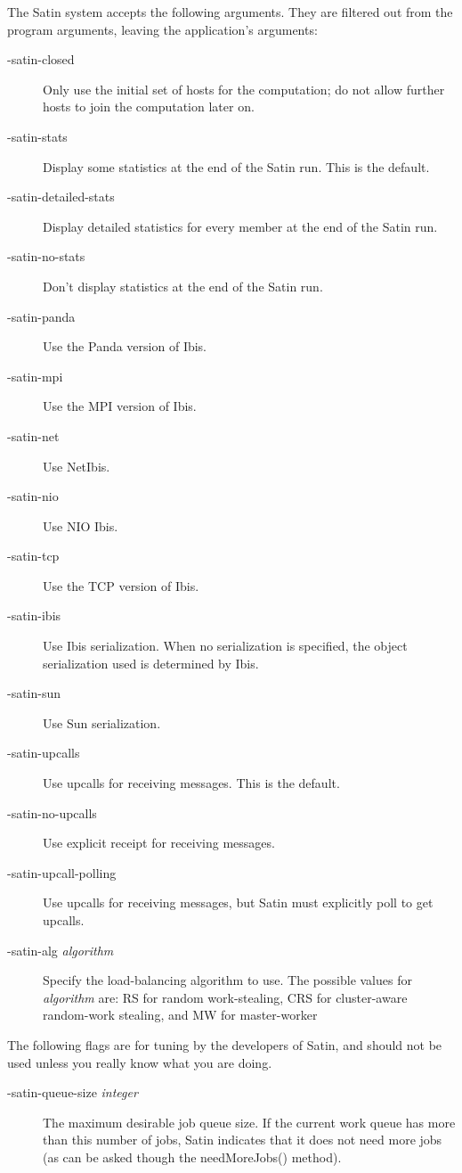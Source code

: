 \documentclass[10pt]{article}
\begin{document}
The Satin system accepts the following arguments. They are
filtered out from the program arguments, leaving the application's
arguments:
\begin{description}
\item[-satin-closed]
Only use the initial set of hosts for the computation; do not allow
further hosts to join the computation later on.
\item[-satin-stats]
Display some statistics at the end of the Satin run. This is the default.
\item[-satin-detailed-stats]
Display detailed statistics for every member at the end of the Satin run.
\item[-satin-no-stats]
Don't display statistics at the end of the Satin run.
\item[-satin-panda]
Use the Panda version of Ibis.
\item[-satin-mpi]
Use the MPI version of Ibis.
\item[-satin-net]
Use NetIbis.
\item[-satin-nio]
Use NIO Ibis.
\item[-satin-tcp]
Use the TCP version of Ibis.
\item[-satin-ibis]
Use Ibis serialization. When no serialization is specified,
the object serialization used is determined by Ibis.
\item[-satin-sun]
Use Sun serialization.
\item[-satin-upcalls]
Use upcalls for receiving messages. This is the default.
\item[-satin-no-upcalls]
Use explicit receipt for receiving messages.
\item[-satin-upcall-polling]
Use upcalls for receiving messages, but Satin must explicitly poll to get
upcalls.
\item[-satin-alg \emph{algorithm}]
Specify the load-balancing algorithm to use. The possible values for
\emph{algorithm} are: RS for random work-stealing, CRS for cluster-aware
random-work stealing, and MW for master-worker
\end{description}

The following flags are for tuning by the developers of Satin,
and should not be used unless you really know what you are doing.
\begin{description}
\item[-satin-queue-size \emph{integer}]
The maximum desirable job queue size. If the current work queue 
has more than this number of jobs, Satin indicates that 
it does not need more jobs (as can be asked though the
needMoreJobs() method).
\end{description}
\end{document}
